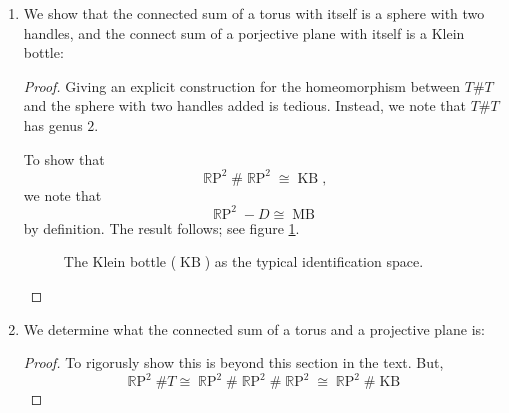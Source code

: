 \documentclass{book}
\DeclareMathOperator*{\R}{\mathbb{R}}
\DeclareMathOperator*{\RP}{\R\text{P}}
\DeclareMathOperator*{\KB}{\text{KB}}
\DeclareMathOperator*{\MB}{\text{MB}}
\begin{document}
\begin{enumerate}[(1)]
    \item We show that the connected sum of a torus with itself is a sphere with two handles, and the connect sum of a porjective plane with itself is a Klein bottle: 
        \begin{proof} Giving an explicit construction for the homeomorphism between $T \# T$ and the sphere with two handles added is tedious. Instead, we note that $T \# T$ has genus $2$. 
            \par To show that 
            \[\RP^2 \# \RP^2 \cong \KB,\]
            we note that 
            \[\RP^2 - D \cong \MB\]
            by definition. The result follows; see figure \hyperref[fig:tikz:KB]{\ref{fig:tikz:KB}}.
            \begin{figure}
                \centering
                
                \caption{The Klein bottle ($\KB$) as the typical identification space.}
                \label{fig:tikz:KB}
            \end{figure}
        \end{proof}

    \item We determine what the connected sum of a torus and a projective plane is: 
        \begin{proof} To rigorusly show this is beyond this section in the text. But, 
            \[\RP^2 \# T \cong \RP^2 \# \RP^2 \# \RP^2 \cong \RP^2 \# \KB \]
        \end{proof}
\end{enumerate}
\end{document}
